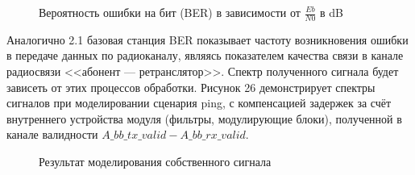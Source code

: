 \begin{figure}[h]
		\begin{minipage}[h]{0.49\linewidth}
		\end{minipage}
		\hfill
		\begin{minipage}[h]{0.49\linewidth}
		\end{minipage}
		\caption{Вероятность ошибки на бит (BER) в зависимости от $\frac{Eb}{N0}$ в dB}
		\label{fig:model24}
\end{figure}

\begin{onehalfspace}
Аналогично 2.1 базовая станция BER показывает частоту возникновения ошибки в передаче данных по радиоканалу, являясь показателем качества связи в канале радиосвязи <<абонент — ретранслятор>>. Спектр полученного сигнала будет зависеть от этих процессов обработки. Рисунок 26 демонстрирует спектры сигналов при моделировании сценария ping, с компенсацией задержек за счёт внутреннего устройства модуля (фильтры, модулирующие блоки), полученной в канале валидности $A\_bb\_tx\_valid - A\_bb\_rx\_valid$.
\end{onehalfspace}

\begin{figure}[h]
		\begin{minipage}[h]{0.49\linewidth}
		\end{minipage}
		\hfill
		\begin{minipage}[h]{0.49\linewidth}
		\end{minipage}
		\caption{Результат моделирования собственного сигнала}
		\label{fig:model25}
	\end{figure}



